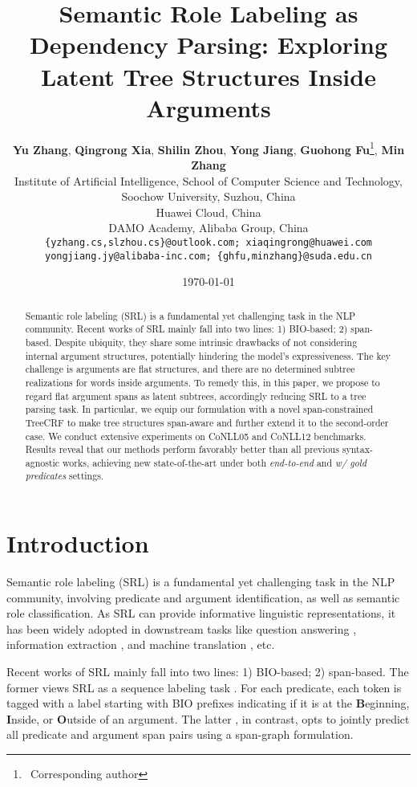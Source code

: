 \documentclass[11pt]{article}
\title{Semantic Role Labeling as Dependency Parsing: Exploring \\
Latent Tree Structures Inside Arguments}
\author{
    \textbf{Yu Zhang}\suda,
    \textbf{Qingrong Xia}\suda\huawei,
    \textbf{Shilin Zhou}\suda,
    \textbf{Yong Jiang}\damo,
    \textbf{Guohong Fu}\suda\thanks{$~~$Corresponding author},
    \textbf{Min Zhang}\suda \\
    \suda Institute of Artificial Intelligence, School of Computer Science and Technology, \\
    Soochow University, Suzhou, China\\
    \huawei Huawei Cloud, China \\
    \damo DAMO Academy, Alibaba Group, China \\
    \texttt{\{yzhang.cs,slzhou.cs\}@outlook.com; xiaqingrong@huawei.com} \\
    \texttt{yongjiang.jy@alibaba-inc.com; \{ghfu,minzhang\}@suda.edu.cn}
}
\date{\today}
\begin{document}
\maketitle
\begin{abstract}
    Semantic role labeling (SRL) is a fundamental yet challenging task in the NLP community.
    Recent works of SRL mainly fall into two lines: 1) BIO-based; 2) span-based.
    Despite ubiquity, they share some intrinsic drawbacks of not considering internal argument structures, potentially hindering the model's expressiveness.
    The key challenge is arguments are flat structures, and there are no determined subtree realizations for words inside arguments.
    To remedy this, in this paper, we propose to regard flat argument spans as latent subtrees, accordingly reducing SRL to a tree parsing task.
    In particular, we equip our formulation with a novel span-constrained TreeCRF to make tree structures span-aware and further extend it to the second-order case.
    We conduct extensive experiments on CoNLL05 and CoNLL12 benchmarks.
    Results reveal that our methods perform favorably better than all previous syntax-agnostic works, achieving new state-of-the-art under both \emph{end-to-end} and \emph{w/ gold predicates} settings.
\end{abstract}

\section{Introduction}\label{sec:intro}

Semantic role labeling (SRL) is a fundamental yet challenging task in the NLP community, involving predicate and argument identification, as well as semantic role classification.
As SRL can provide informative linguistic representations, it has been widely adopted in downstream tasks like question answering \cite{berant-etal-2013-semantic,yih-etal-2016-value}, information extraction \cite{christensen-etal-2010-semantic,lin-etal-2017-neural}, and machine translation \cite{liu-gildea-2010-semantic,bazrafshan-gildea-2013-semantic}, etc.

Recent works of SRL mainly fall into two lines: 1) BIO-based; 2) span-based.
The former views SRL as a sequence labeling task \cite{zhou-xu-2015-end,strubell-etal-2018-lisa,shi-etal-2019-simple}.
For each predicate, each token is tagged with a label starting with BIO prefixes indicating if it is at the \textbf{B}eginning, \textbf{I}nside, or \textbf{O}utside of an argument.
The latter \cite{he-etal-2018-jointly,ouchi-etal-2018-span,li-etal-2019-dependency}, in contrast, opts to jointly predict all predicate and argument span pairs using a span-graph formulation.
\end{document}
